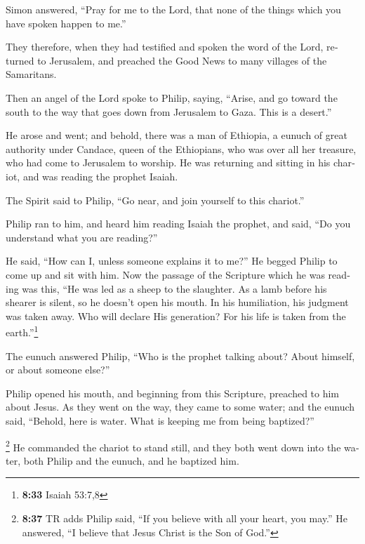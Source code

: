 \begin{paracol}{2}
\begin{otherlanguage}{english}
 Simon answered, ``Pray for me to the Lord, that none of
the things which you have spoken happen to me.''

 They therefore, when they had testified and spoken the
word of the Lord, returned to Jerusalem, and preached the Good News to
many villages of the Samaritans.

 Then an angel of the Lord spoke to Philip, saying,
``Arise, and go toward the south to the way that goes down from
Jerusalem to Gaza. This is a desert.''

 He arose and went; and behold, there was a man of
Ethiopia, a eunuch of great authority under Candace, queen of the
Ethiopians, who was over all her treasure, who had come to Jerusalem to
worship.  He was returning and sitting in his chariot,
and was reading the prophet Isaiah.

 The Spirit said to Philip, ``Go near, and join yourself
to this chariot.''

 Philip ran to him, and heard him reading Isaiah the
prophet, and said, ``Do you understand what you are reading?''

 He said, ``How can I, unless someone explains it to
me?'' He begged Philip to come up and sit with him.  Now
the passage of the Scripture which he was reading was this, ``He was led
as a sheep to the slaughter. As a lamb before his shearer is silent, so
he doesn't open his mouth.  In his humiliation, his
judgment was taken away. Who will declare His generation? For his life
is taken from the earth.''\footnote{\textbf{8:33} Isaiah 53:7,8}

 The eunuch answered Philip, ``Who is the prophet talking
about? About himself, or about someone else?''

 Philip opened his mouth, and beginning from this
Scripture, preached to him about Jesus.  As they went on
the way, they came to some water; and the eunuch said, ``Behold, here is
water. What is keeping me from being baptized?''

 \footnote{\textbf{8:37} TR adds Philip said, ``If you
  believe with all your heart, you may.'' He answered, ``I believe that
  Jesus Christ is the Son of God.''}  He commanded the
chariot to stand still, and they both went down into the water, both
Philip and the eunuch, and he baptized him.


\end{otherlanguage}
\end{paracol}
